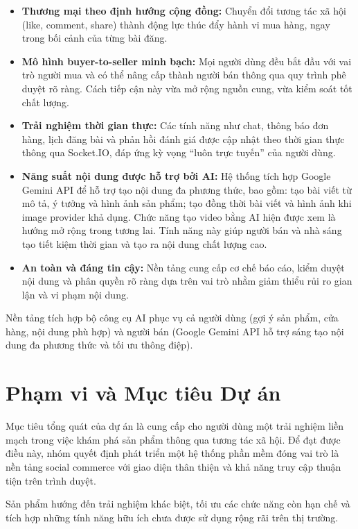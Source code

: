 \begin{itemize}
\item \textbf{Thương mại theo định hướng cộng đồng:} Chuyển đổi tương tác xã hội (like, comment, share) thành động lực thúc đẩy hành vi mua hàng, ngay trong bối cảnh của từng bài đăng.
\item \textbf{Mô hình buyer-to-seller minh bạch:} Mọi người dùng đều bắt đầu với vai trò người mua và có thể nâng cấp thành người bán thông qua quy trình phê duyệt rõ ràng. Cách tiếp cận này vừa mở rộng nguồn cung, vừa kiểm soát tốt chất lượng.
\item \textbf{Trải nghiệm thời gian thực:} Các tính năng như chat, thông báo đơn hàng, lịch đăng bài và phản hồi đánh giá được cập nhật theo thời gian thực thông qua Socket.IO, đáp ứng kỳ vọng “luôn trực tuyến” của người dùng.
    \item \textbf{Năng suất nội dung được hỗ trợ bởi AI:} Hệ thống tích hợp Google Gemini API để hỗ trợ tạo nội dung đa phương thức, bao gồm: tạo bài viết từ mô tả, ý tưởng và hình ảnh sản phẩm; tạo đồng thời bài viết và hình ảnh khi image provider khả dụng. Chức năng tạo video bằng AI hiện được xem là hướng mở rộng trong tương lai. Tính năng này giúp người bán và nhà sáng tạo tiết kiệm thời gian và tạo ra nội dung chất lượng cao.
\item \textbf{An toàn và đáng tin cậy:} Nền tảng cung cấp cơ chế báo cáo, kiểm duyệt nội dung và phân quyền rõ ràng dựa trên vai trò nhằm giảm thiểu rủi ro gian lận và vi phạm nội dung.
\end{itemize}

Nền tảng tích hợp bộ công cụ AI phục vụ cả người dùng (gợi ý sản phẩm, cửa hàng, nội dung phù hợp) và người bán (Google Gemini API hỗ trợ sáng tạo nội dung đa phương thức và tối ưu thông điệp).

\section{Phạm vi và Mục tiêu Dự án}
Mục tiêu tổng quát của dự án là cung cấp cho người dùng một trải nghiệm liền mạch trong việc khám phá sản phẩm thông qua tương tác xã hội. Để đạt được điều này, nhóm quyết định phát triển một hệ thống phần mềm đóng vai trò là nền tảng social commerce với giao diện thân thiện và khả năng truy cập thuận tiện trên trình duyệt.

Sản phẩm hướng đến trải nghiệm khác biệt, tối ưu các chức năng còn hạn chế và tích hợp những tính năng hữu ích chưa được sử dụng rộng rãi trên thị trường.


